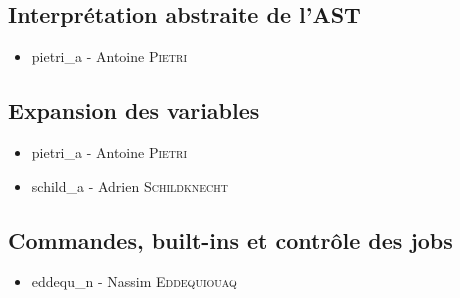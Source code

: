 \subsection{Interprétation abstraite de l'AST}

\begin{itemize}
    \item pietri\_a - Antoine \textsc{Pietri}
\end{itemize}

\subsection{Expansion des variables}

\begin{itemize}
    \item pietri\_a - Antoine \textsc{Pietri}
    \item schild\_a - Adrien \textsc{Schildknecht}
\end{itemize}

\subsection{Commandes, built-ins et contrôle des jobs}

\begin{itemize}
    \item eddequ\_n - Nassim \textsc{Eddequiouaq}
\end{itemize}
